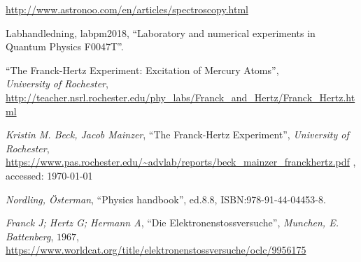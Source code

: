 \begin{thebibliography}{99}
\label{sec:ref}

	\url{http://www.astronoo.com/en/articles/spectroscopy.html}
	
	Labhandledning, labpm2018, ``Laboratory and numerical experiments in Quantum Physics F0047T''.
	
	``The Franck-Hertz Experiment: Excitation of Mercury Atoms'',\\\emph{University of Rochester},
	\url{http://teacher.nsrl.rochester.edu/phy_labs/Franck_and_Hertz/Franck_Hertz.html}

	\emph{Kristin M. Beck, Jacob Mainzer}, ``The Franck-Hertz Experiment'', \emph{University of Rochester},
	\url{https://www.pas.rochester.edu/~advlab/reports/beck_mainzer_franckhertz.pdf} , accessed: \today
	
	\emph{Nordling, Österman}, ``Physics handbook'', ed.8.8, ISBN:978-91-44-04453-8.

	\emph{Franck J; Hertz G; Hermann A}, ``Die Elektronenstossversuche'', \emph{Munchen, E. Battenberg}, \textcopyright$1967$, \url{https://www.worldcat.org/title/elektronenstossversuche/oclc/9956175}
\end{thebibliography}